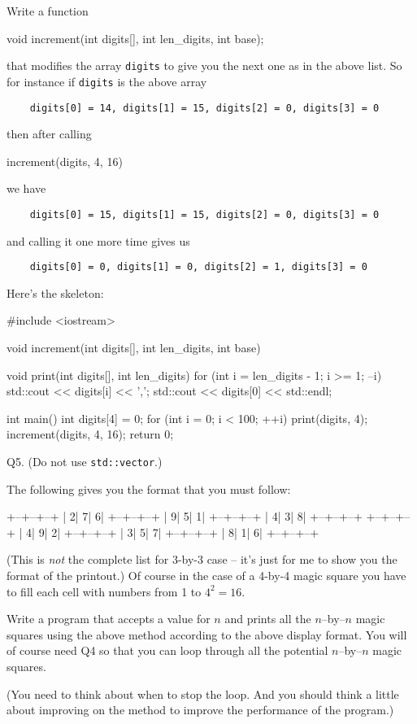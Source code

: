 Write a function
\begin{console}[commandchars=\\\{\}]
void increment(int digits[], int len_digits, int base);
\end{console}
that modifies the array \verb!digits! to give you the next one
as in the above list. 
So for instance if \verb!digits! is the above array
\begin{verbatim}
    digits[0] = 14, digits[1] = 15, digits[2] = 0, digits[3] = 0
\end{verbatim}
then after calling
\begin{console}
increment(digits, 4, 16)
\end{console}
we have
\begin{verbatim}
    digits[0] = 15, digits[1] = 15, digits[2] = 0, digits[3] = 0
\end{verbatim}
and calling it one more time gives us
\begin{verbatim}
    digits[0] = 0, digits[1] = 0, digits[2] = 1, digits[3] = 0
\end{verbatim}
Here's the skeleton:
\begin{console}[commandchars=\~\!\@]
#include <iostream>

void increment(int digits[], int len_digits, int base)
{
}

void print(int digits[], int len_digits)
{
    for (int i = len_digits - 1; i >= 1; --i)
    {
        std::cout << digits[i] << ',';
    } 
    std::cout << digits[0] << std::endl;
}

int main()
{
    int digits[4] = {0};
    for (int i = 0; i < 100; ++i)
    {
        print(digits, 4);
        increment(digits, 4, 16);
    }
    return 0;
}
\end{console}


\newpage
Q5. (Do not use \verb!std::vector!.)

The following gives you the format that you must follow:
\begin{console}
+--+--+--+ 
| 2| 7| 6| 
+--+--+--+ 
| 9| 5| 1|
+--+--+--+ 
| 4| 3| 8|
+--+--+--+
+--+--+--+ 
| 4| 9| 2| 
+--+--+--+ 
| 3| 5| 7|
+--+--+--+ 
| 8| 1| 6|
+--+--+--+ 
\end{console}
(This is \textit{not} the complete list for $3$-by-$3$ case --
it's just for me to show you the format of the printout.)
Of course in the case of a 4-by-4 magic square you have to fill each
cell with numbers from 1 to $4^2 = 16$.

Write a program that accepts a value for $n$ and prints all the
$n$--by--$n$ magic squares using the above method according to the 
above display format. You will of course need Q4 so that
you can loop through all the potential $n$--by--$n$ magic squares.

(You need to think about when to stop the loop.
And you should think a little about improving on the method
to improve the performance of the program.)


